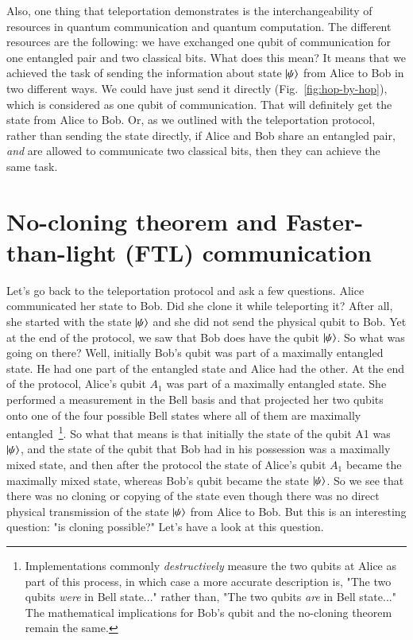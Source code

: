 Also, one thing that teleportation demonstrates is the interchangeability of resources in quantum communication and quantum computation. The different resources are the following: we have exchanged one qubit of communication for one entangled pair and two classical bits. What does this mean? It means that we achieved the task of sending the information about state $\left| \psi \right\rangle$ from Alice to Bob in two different ways. We could have just send it directly (Fig.~\ref{fig:hop-by-hop}), which is considered as one qubit of communication. That will definitely get the state from Alice to Bob. Or, as we outlined with the teleportation protocol, rather than sending the state directly, if Alice and Bob share an entangled pair, \emph{and} are allowed to communicate two classical bits, then they can achieve the same task.

\section{No-cloning theorem and Faster-than-light (FTL) communication}

Let's go back to the teleportation protocol and ask a few questions. Alice communicated her state to Bob. Did she clone it while teleporting it? After all, she started with the state $\left| \psi \right\rangle$ and she did not send the physical qubit to Bob. Yet at the end of the protocol, we saw that Bob does have the qubit $\left| \psi \right\rangle$. So what was going on there? Well, initially Bob's qubit was part of a maximally entangled state. He had one part of the entangled state and Alice had the other. At the end of the protocol, Alice's qubit $A_1$ was part of a maximally entangled state. She performed a measurement in the Bell basis and that projected her two qubits onto one of the four possible Bell states where all of them are maximally entangled~\footnote{Implementations commonly \emph{destructively} measure the two qubits at Alice as part of this process, in which case a more accurate description is, "The two qubits \emph{were} in Bell state..." rather than, "The two qubits \emph{are} in Bell state..." The mathematical implications for Bob's qubit and the no-cloning theorem remain the same.}. So what that means is that initially the state of the qubit A1 was $\left| \psi \right\rangle$, and the state of the qubit that Bob had in his possession was a maximally mixed state, and then after the protocol the state of Alice's qubit $A_1$ became the maximally mixed state, whereas Bob's qubit became the state $\left| \psi \right\rangle$. So we see that there was no cloning or copying of the state even though there was no direct physical transmission of the state $\left| \psi \right\rangle$ from Alice to Bob. But this is an interesting question: "is cloning possible?"  Let's have a look at this question.

